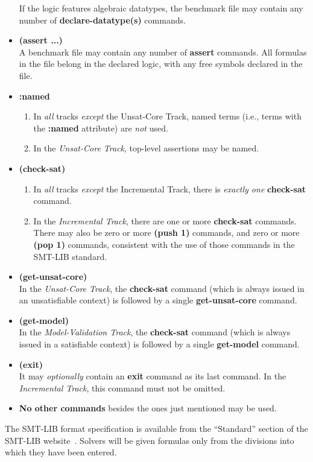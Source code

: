 \documentclass[12pt]{article}
\newcommand{\akey}[1]{\textbf{#1}\xspace}
\newcommand{\bkey}[1]{\textbf{{#1}}\xspace}
\newcommand{\inctrack}{Incremental Track\xspace}
\newcommand{\ucoretrack}{Unsat-Core Track\xspace}
\newcommand{\mvaltrack}{Model-Validation Track\xspace}
\begin{document}
\begin{itemize}
    If the logic features algebraic datatypes, the benchmark file may
    contain any number of \akey{declare-datatype(s)} commands.
  \item \bkey{(assert ...)}\\
    A benchmark file may contain any number of \akey{assert} commands.  All
    formulas in the file belong in the declared logic, with any free symbols
    declared in the file.
  \item
    \bkey{:named}
    \begin{enumerate}[label=(\alph*)]
      \vspace{-1ex}
      \item In \emph{all} tracks \emph{except} the \ucoretrack,  named
        terms (i.e., terms with the \akey{:named} attribute) are \emph{not}
        used.
      \item In the \emph{\ucoretrack}, top-level assertions may be named.
    \end{enumerate}
    \item
      \bkey{(check-sat)}
      \begin{enumerate}[label=(\alph*)]
        \vspace{-1ex}
        \item In \emph{all} tracks \emph{except} the \inctrack, there is
          \emph{exactly one} \akey{check-sat} command.
        \item In the \emph{\inctrack}, there are one or more
        \akey{check-sat} commands.  There may also be zero or more
        \akey{(push 1)} commands, and zero or more \akey{(pop 1)} commands,
        consistent with the use of those commands in the SMT-LIB standard.
    \end{enumerate}
    \item \bkey{(get-unsat-core)}\\
      In the \emph{\ucoretrack}, the \akey{check-sat} command (which is
      always issued in an unsatisfiable context) is followed by a single
      \akey{get-unsat-core} command.
    \item \bkey{(get-model)}\\
      In the \emph{\mvaltrack}, the \akey{check-sat} command (which is
      always issued in a satisfiable context) is followed by a single
    \akey{get-model} command.
  \item \bkey{(exit)}\\
    It may \emph{optionally} contain an \akey{exit} command as its
    last command.  In the \emph{\inctrack}, this command must not be
    omitted.
  \item \textbf{No other commands} besides the ones just mentioned may be used.
\end{itemize}
%
The SMT-LIB format specification is available from the ``Standard''
section of the SMT-LIB website~\cite{SMT-LIB}.  Solvers will be given
formulas only from the divisions into which they have been entered.
\end{document}
